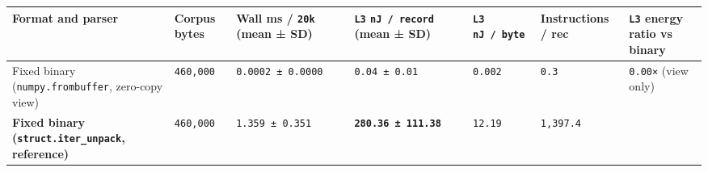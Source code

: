 \documentclass[10pt,letterpaper]{article}
\newcounter{none}
\begin{document}
{\def\LTcaptype{none} %
{\scriptsize\setlength{\tabcolsep}{3.0pt}\renewcommand{\arraystretch}{1.14}
\begin{longtable}[]{@{}
  >{\raggedright\arraybackslash}p{}
  >{\raggedleft\arraybackslash}p{}
  >{\raggedleft\arraybackslash}p{}
  >{\raggedleft\arraybackslash}p{}
  >{\raggedleft\arraybackslash}p{}
  >{\raggedleft\arraybackslash}p{}
  >{\raggedleft\arraybackslash}p{}@{}}
\toprule\noalign{}
\begin{minipage}[b]{\linewidth}\raggedright
\textbf{Format and parser}
\end{minipage} & \begin{minipage}[b]{\linewidth}\raggedleft
\textbf{Corpus bytes}
\end{minipage} & \begin{minipage}[b]{\linewidth}\raggedleft
\textbf{Wall ms / \texttt{20k} (mean ± SD)}
\end{minipage} & \begin{minipage}[b]{\linewidth}\raggedleft
\textbf{\texttt{L3} \texttt{nJ\ /\ record} (mean ± SD)}
\end{minipage} & \begin{minipage}[b]{\linewidth}\raggedleft
\textbf{\texttt{L3} \texttt{nJ\ /\ byte}}
\end{minipage} & \begin{minipage}[b]{\linewidth}\raggedleft
\textbf{Instructions / rec}
\end{minipage} & \begin{minipage}[b]{\linewidth}\raggedleft
\textbf{\texttt{L3} energy ratio vs binary}
\end{minipage} \\
\midrule\noalign{}
\endhead
\bottomrule\noalign{}
\endlastfoot
Fixed binary (\texttt{numpy.\allowbreak{}frombuffer}, zero-copy view) &
\texttt{460,000} & \texttt{0.\allowbreak{}0002\ ±\ 0.\allowbreak{}0000} & \texttt{0.04\ ±\ 0.01} &
\texttt{0.002} & \texttt{0.3} & \texttt{0.00×} (view only) \\
\textbf{Fixed binary (\texttt{struct.\allowbreak{}iter\_\allowbreak{}unpack}, reference)} &
\texttt{460,000} & \texttt{1.359\ ±\ 0.351} &
\textbf{\texttt{280.\allowbreak{}36\ ±\ 111.\allowbreak{}38}} & \texttt{12.19} & \texttt{1,397.4}

\end{longtable}}}
\end{document}
